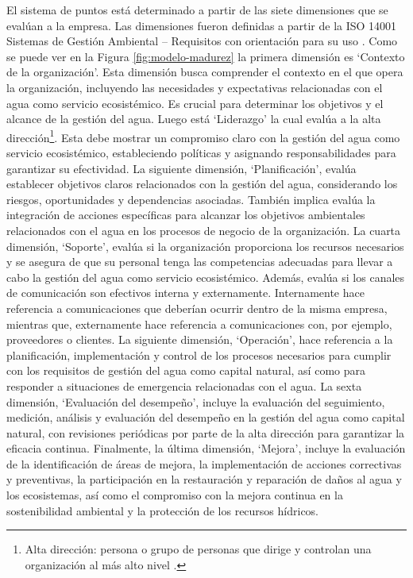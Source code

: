El sistema de puntos está determinado a partir de las siete dimensiones que se evalúan a la empresa. Las dimensiones fueron definidas a partir de la ISO 14001 Sistemas de Gestión Ambiental – Requisitos con orientación para su uso \parencite{iso-2015}. Como se puede ver en la Figura \ref{fig:modelo-madurez} la primera dimensión es ‘Contexto de la organización’. Esta dimensión busca comprender el contexto en el que opera la organización, incluyendo las necesidades y expectativas relacionadas con el agua como servicio ecosistémico. Es crucial para determinar los objetivos y el alcance de la gestión del agua. Luego está ‘Liderazgo’ la cual evalúa a la alta dirección\footnote{Alta dirección: persona o grupo de personas que dirige y controlan una organización al más alto nivel \parencite{iso-2015}.}. Esta debe mostrar un compromiso claro con la gestión del agua como servicio ecosistémico, estableciendo políticas y asignando responsabilidades para garantizar su efectividad. La siguiente dimensión, ‘Planificación’, evalúa establecer objetivos claros relacionados con la gestión del agua, considerando los riesgos, oportunidades y dependencias asociadas. También implica evalúa la integración de acciones específicas para alcanzar los objetivos ambientales relacionados con el agua en los procesos de negocio de la organización. La cuarta dimensión, ‘Soporte’, evalúa si la organización proporciona los recursos necesarios y se asegura de que su personal tenga las competencias adecuadas para llevar a cabo la gestión del agua como servicio ecosistémico. Además, evalúa si los canales de comunicación son efectivos interna y externamente.  Internamente hace referencia a comunicaciones que deberían ocurrir dentro de la misma empresa, mientras que, externamente hace referencia a comunicaciones con, por ejemplo, proveedores o clientes. La siguiente dimensión, ‘Operación’, hace referencia a la planificación, implementación y control de los procesos necesarios para cumplir con los requisitos de gestión del agua como capital natural, así como para responder a situaciones de emergencia relacionadas con el agua. La sexta dimensión, ‘Evaluación del desempeño’, incluye la evaluación del seguimiento, medición, análisis y evaluación del desempeño en la gestión del agua como capital natural, con revisiones periódicas por parte de la alta dirección para garantizar la eficacia continua. Finalmente, la última dimensión, ‘Mejora’, incluye la evaluación de la identificación de áreas de mejora, la implementación de acciones correctivas y preventivas, la participación en la restauración y reparación de daños al agua y los ecosistemas, así como el compromiso con la mejora continua en la sostenibilidad ambiental y la protección de los recursos hídricos.

